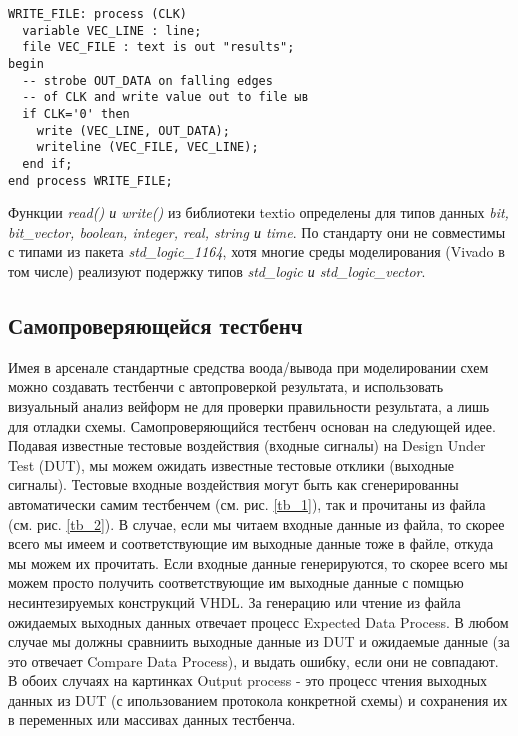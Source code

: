 \begin{Code}
\begin{lstlisting}
WRITE_FILE: process (CLK)
  variable VEC_LINE : line;
  file VEC_FILE : text is out "results";
begin
  -- strobe OUT_DATA on falling edges
  -- of CLK and write value out to file ыв
  if CLK='0' then
    write (VEC_LINE, OUT_DATA);
    writeline (VEC_FILE, VEC_LINE);
  end if;
end process WRITE_FILE;
\end{lstlisting}
\end{Code}

Функции \emph{read() и write()} из библиотеки textio определены для типов данных \emph{bit, bit\_vector, boolean, integer, real, string и time}. По стандарту они не совместимы с типами из пакета \emph{std\_logic\_1164}, хотя многие среды моделирования (Vivado в том числе) реализуют подержку типов \emph{std\_logic и std\_logic\_vector}.


\subsection{Самопроверяющейся тестбенч}

Имея в арсенале стандартные средства воода/вывода при моделировании схем можно создавать тестбенчи с автопроверкой результата, и использовать визуальный анализ вейформ не для проверки правильности результата, а лишь для отладки схемы. Самопроверяющийся тестбенч основан на следующей идее. Подавая известные тестовые воздействия (входные сигналы) на Design Under Test (DUT), мы можем ожидать известные тестовые отклики (выходные сигналы). Тестовые входные воздействия могут быть как сгенерированны автоматически самим тестбенчем (см. рис. \ref{tb_1}), так и прочитаны из файла (см. рис. \ref{tb_2}). В случае, если мы читаем входные данные из файла, то скорее всего мы имеем и соответствующие им выходные данные тоже в файле, откуда мы можем их прочитать. Если входные данные генерируются, то скорее всего мы можем просто получить соответствующие им выходные данные с помщью несинтезируемых конструкций VHDL. За генерацию или чтение из файла ожидаемых выходных данных отвечает процесс Expected Data Process. В любом случае мы должны сравниить выходные данные из DUT и ожидаемые данные (за это отвечает Compare Data Process), и выдать ошибку, если они не совпадают. В обоих случаях на картинках Output process - это процесс чтения выходных данных из DUT (с ипользованием протокола конкретной схемы) и сохранения их в переменных или массивах данных тестбенча. 

